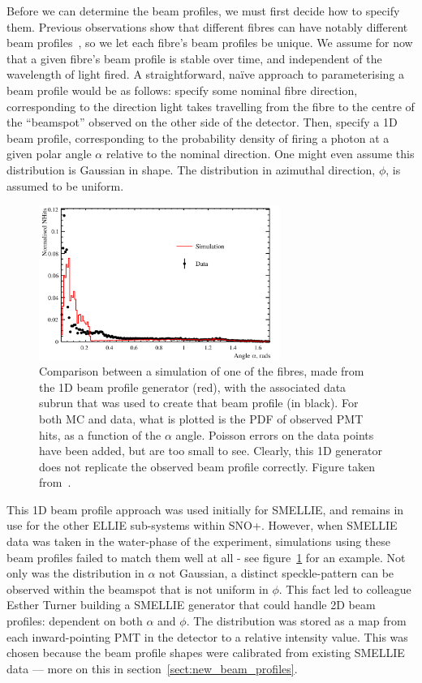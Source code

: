Before we can determine the beam profiles, we must first decide how to specify them. Previous observations show that different fibres can have notably different beam profiles~\cite{majumdar_measurement_2015}, so we let each fibre's beam profiles be unique. We assume for now that a given fibre's beam profile is stable over time, and independent of the wavelength of light fired. A straightforward, na\"{i}ve approach to parameterising a beam profile would be as follows: specify some nominal fibre direction, corresponding to the direction light takes travelling from the fibre to the centre of the ``beamspot'' observed on the other side of the detector. Then, specify a 1D beam profile, corresponding to the probability density of firing a photon at a given polar angle $\alpha$ relative to the nominal direction. One might even assume this distribution is Gaussian in shape. The distribution in azimuthal direction, $\phi$, is assumed to be uniform.

\begin{figure}
    \centering
    \includegraphics[width=0.7\textwidth]{5_SMELLIESimulation/images/1D_gen_plot.png}
    \caption{Comparison between a simulation of one of the fibres, made from the 1D beam profile generator (red), with the associated data subrun that was used to create that beam profile (in black). For both MC and data, what is plotted is the PDF of observed PMT hits, as a function of the $\alpha$ angle. Poisson errors on the data points have been added, but are too small to see. Clearly, this 1D generator does not replicate the observed beam profile correctly. Figure taken from~\cite{turner_measurement_nodate}.}
    \label{fig:1d_gen_plot}
\end{figure}

This 1D beam profile approach was used initially for SMELLIE, and remains in use for the other ELLIE sub-systems within SNO+. However, when SMELLIE data was taken in the water-phase of the experiment, simulations using these beam profiles failed to match them well at all - see figure~\ref{fig:1d_gen_plot} for an example. Not only was the distribution in $\alpha$ not Gaussian, a distinct speckle-pattern can be observed within the beamspot that is not uniform in $\phi$. This fact led to colleague Esther Turner building a SMELLIE generator that could handle 2D beam profiles: dependent on both $\alpha$ and $\phi$. The distribution was stored as a map from each inward-pointing PMT in the detector to a relative intensity value. This was chosen because the beam profile shapes were calibrated from existing SMELLIE data --- more on this in section~\ref{sect:new_beam_profiles}.


